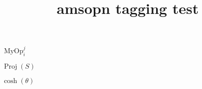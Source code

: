 \documentclass{article}
\title{amsopn tagging test}
\DeclareMathOperator{\Proj}{Proj}
\begin{document}
$\operatorname{MyOp}_i^j$

$\Proj(S)$

$\cosh(\theta)$
\end{document}
